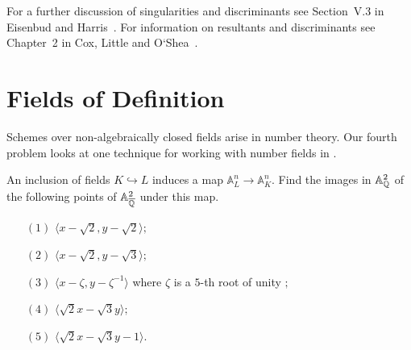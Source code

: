 For a further discussion of singularities and discriminants see
Section~V.3 in Eisenbud and Harris~\cite{SC:EH}.  For information on
resultants and discriminants see Chapter~2 in Cox, Little and
O`Shea~\cite{SC:CLO2}.


\section{Fields of Definition}

Schemes over non-algebraically
closed fields arise in number theory.  Our fourth problem looks at one
technique for working with number fields in \Mtwo.

\begin{problem*}
An inclusion of fields $K \hookrightarrow L$ induces a map
$\mathbb{A}_{L}^{n} \to \mathbb{A}_{K}^{n}$.  Find the images in
$\mathbb{A}_{{\mathbb Q}}^{2}$ of the following points of
$\mathbb{A}_{\overline{{\mathbb Q}}}^{2}$ under this map.
\begin{enumerate}
\item[$(1)$] $\langle x - \sqrt{2}, y - \sqrt{2} \rangle ;$
\item[$(2)$] $\langle x - \sqrt{2}, y - \sqrt{3} \rangle ;$
\item[$(3)$] $\langle x - \zeta, y - \zeta^{-1} \rangle$ where $\zeta$
is a $5$-th root of unity $;$
\item[$(4)$] $\langle \sqrt{2}x- \sqrt{3}y \rangle ;$
\item[$(5)$] $\langle \sqrt{2}x- \sqrt{3}y-1 \rangle$.
\end{enumerate}
\end{problem*}

